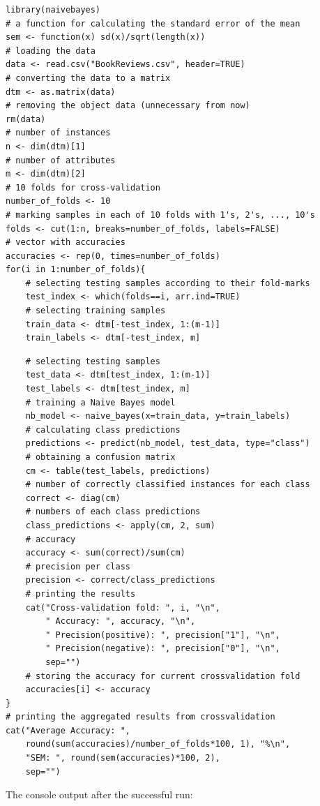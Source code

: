 \documentclass[10pt]{book}
\begin{document}
\begin{verbatim}
library(naivebayes)
# a function for calculating the standard error of the mean
sem <- function(x) sd(x)/sqrt(length(x))
# loading the data
data <- read.csv("BookReviews.csv", header=TRUE)
# converting the data to a matrix
dtm <- as.matrix(data)
# removing the object data (unnecessary from now)
rm(data)
# number of instances
n <- dim(dtm)[1]
# number of attributes
m <- dim(dtm)[2]
# 10 folds for cross-validation
number_of_folds <- 10
# marking samples in each of 10 folds with 1's, 2's, ..., 10's
folds <- cut(1:n, breaks=number_of_folds, labels=FALSE)
# vector with accuracies
accuracies <- rep(0, times=number_of_folds)
for(i in 1:number_of_folds){
    # selecting testing samples according to their fold-marks
    test_index <- which(folds==i, arr.ind=TRUE)
    # selecting training samples
    train_data <- dtm[-test_index, 1:(m-1)]
    train_labels <- dtm[-test_index, m]
\end{verbatim}

\begin{verbatim}
    # selecting testing samples
    test_data <- dtm[test_index, 1:(m-1)]
    test_labels <- dtm[test_index, m]
    # training a Naive Bayes model
    nb_model <- naive_bayes(x=train_data, y=train_labels)
    # calculating class predictions
    predictions <- predict(nb_model, test_data, type="class")
    # obtaining a confusion matrix
    cm <- table(test_labels, predictions)
    # number of correctly classified instances for each class
    correct <- diag(cm)
    # numbers of each class predictions
    class_predictions <- apply(cm, 2, sum)
    # accuracy
    accuracy <- sum(correct)/sum(cm)
    # precision per class
    precision <- correct/class_predictions
    # printing the results
    cat("Cross-validation fold: ", i, "\n",
        " Accuracy: ", accuracy, "\n",
        " Precision(positive): ", precision["1"], "\n",
        " Precision(negative): ", precision["0"], "\n",
        sep="")
    # storing the accuracy for current crossvalidation fold
    accuracies[i] <- accuracy
}
# printing the aggregated results from crossvalidation
cat("Average Accuracy: ",
    round(sum(accuracies)/number_of_folds*100, 1), "%\n",
    "SEM: ", round(sem(accuracies)*100, 2),
    sep="")
\end{verbatim}

The console output after the successful run:
\end{document}
